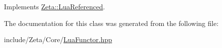 Implements \hyperlink{classZeta_1_1LuaReferenced_a8e487b719107baad17268854b878fc81}{Zeta\+::\+Lua\+Referenced}.



The documentation for this class was generated from the following file\+:\begin{DoxyCompactItemize}
\item 
include/\+Zeta/\+Core/\hyperlink{LuaFunctor_8hpp}{Lua\+Functor.\+hpp}\end{DoxyCompactItemize}
